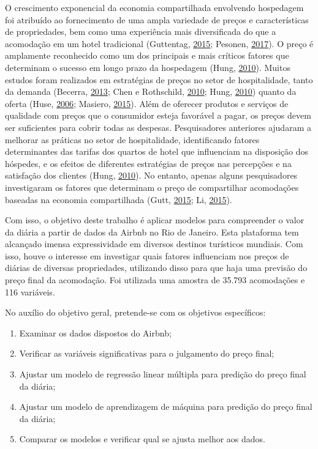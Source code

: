\documentclass[
	12pt,				%
	a4paper,		%
	oneside,    %
	chapter=TITLE,		   %
	section=TITLE,		   %
	subsection=TITLE,	   %
	subsubsection=TITLE, %
	english,			%
	french,				%
	spanish,			%
	brazil,				%
]{abntex2}
\begin{document}
O crescimento exponencial da economia compartilhada envolvendo
hospedagem foi atribuído ao fornecimento de uma ampla variedade de
preços e características de propriedades, bem como uma experiência mais
diversificada do que a acomodação em um hotel tradicional (Guttentag,
\protect\hyperlink{ref-guttentag2015airbnb}{2015}; Pesonen,
\protect\hyperlink{ref-pesonen2017peer}{2017}). O preço é amplamente
reconhecido como um dos principais e mais críticos fatores que
determinam o sucesso em longo prazo da hospedagem (Hung,
\protect\hyperlink{ref-hung2010pricing}{2010}). Muitos estudos foram
realizados em estratégias de preços no setor de hospitalidade, tanto da
demanda (Becerra, \protect\hyperlink{ref-becerra2013being}{2013}; Chen e
Rothschild, \protect\hyperlink{ref-chen2010application}{2010}; Hung,
\protect\hyperlink{ref-hung2010pricing}{2010}) quanto da oferta (Huse,
\protect\hyperlink{ref-huse2006estimaccao}{2006}; Masiero,
\protect\hyperlink{ref-masiero2015demand}{2015}). Além de oferecer
produtos e serviços de qualidade com preços que o consumidor esteja
favorável a pagar, os preços devem ser suficientes para cobrir todas as
despesas. Pesquisadores anteriores ajudaram a melhorar as práticas no
setor de hospitalidade, identificando fatores determinantes das tarifas
dos quartos de hotel que influenciam na disposição dos hóspedes, e os
efeitos de diferentes estratégias de preços nas percepções e na
satisfação dos clientes (Hung,
\protect\hyperlink{ref-hung2010pricing}{2010}). No entanto, apenas
alguns pesquisadores investigaram os fatores que determinam o preço de
compartilhar acomodações baseadas na economia compartilhada (Gutt,
\protect\hyperlink{ref-gutt2015sharing}{2015}; Li,
\protect\hyperlink{ref-li2015agent}{2015}).

Com isso, o objetivo deste trabalho é aplicar modelos para compreender o
valor da diária a partir de dados da Airbnb no Rio de Janeiro. Esta
plataforma tem alcançado imensa expressividade em diversos destinos
turísticos mundiais. Com isso, houve o interesse em investigar quais
fatores influenciam nos preços de diárias de diversas propriedades,
utilizando disso para que haja uma previsão do preço final da
acomodação. Foi utilizada uma amostra de 35.793 acomodações e 116
variáveis.

No auxílio do objetivo geral, pretende-se com os objetivos específicos:

\begin{enumerate}
\def\labelenumi{\arabic{enumi})}
\item
  Examinar os dados dispostos do Airbnb;
\item
  Verificar as variáveis significativas para o julgamento do preço
  final;
\item
  Ajustar um modelo de regressão linear múltipla para predição do preço
  final da diária;
\item
  Ajustar um modelo de aprendizagem de máquina para predição do preço
  final da diária;
\item
  Comparar os modelos e verificar qual se ajusta melhor aos dados.
\end{enumerate}
\end{document}
